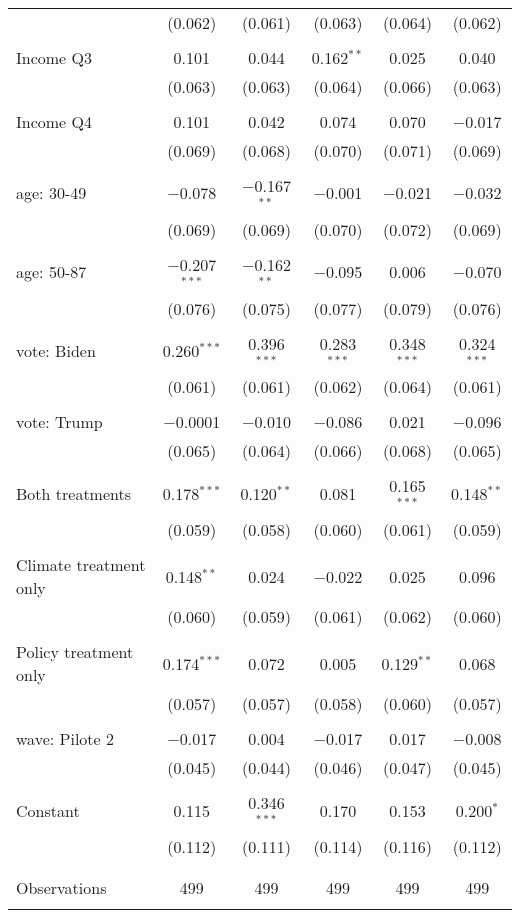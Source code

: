 \begin{tabular}{@{\extracolsep{5pt}}lccccc}
  & (0.062) & (0.061) & (0.063) & (0.064) & (0.062) \\ 
  & & & & & \\ 
 Income Q3 & 0.101 & 0.044 & 0.162$^{**}$ & 0.025 & 0.040 \\ 
  & (0.063) & (0.063) & (0.064) & (0.066) & (0.063) \\ 
  & & & & & \\ 
 Income Q4 & 0.101 & 0.042 & 0.074 & 0.070 & $-$0.017 \\ 
  & (0.069) & (0.068) & (0.070) & (0.071) & (0.069) \\ 
  & & & & & \\ 
 age: 30-49 & $-$0.078 & $-$0.167$^{**}$ & $-$0.001 & $-$0.021 & $-$0.032 \\ 
  & (0.069) & (0.069) & (0.070) & (0.072) & (0.069) \\ 
  & & & & & \\ 
 age: 50-87 & $-$0.207$^{***}$ & $-$0.162$^{**}$ & $-$0.095 & 0.006 & $-$0.070 \\ 
  & (0.076) & (0.075) & (0.077) & (0.079) & (0.076) \\ 
  & & & & & \\ 
 vote: Biden & 0.260$^{***}$ & 0.396$^{***}$ & 0.283$^{***}$ & 0.348$^{***}$ & 0.324$^{***}$ \\ 
  & (0.061) & (0.061) & (0.062) & (0.064) & (0.061) \\ 
  & & & & & \\ 
 vote: Trump & $-$0.0001 & $-$0.010 & $-$0.086 & 0.021 & $-$0.096 \\ 
  & (0.065) & (0.064) & (0.066) & (0.068) & (0.065) \\ 
  & & & & & \\ 
 Both treatments & 0.178$^{***}$ & 0.120$^{**}$ & 0.081 & 0.165$^{***}$ & 0.148$^{**}$ \\ 
  & (0.059) & (0.058) & (0.060) & (0.061) & (0.059) \\ 
  & & & & & \\ 
 Climate treatment only & 0.148$^{**}$ & 0.024 & $-$0.022 & 0.025 & 0.096 \\ 
  & (0.060) & (0.059) & (0.061) & (0.062) & (0.060) \\ 
  & & & & & \\ 
 Policy treatment only & 0.174$^{***}$ & 0.072 & 0.005 & 0.129$^{**}$ & 0.068 \\ 
  & (0.057) & (0.057) & (0.058) & (0.060) & (0.057) \\ 
  & & & & & \\ 
 wave: Pilote 2 & $-$0.017 & 0.004 & $-$0.017 & 0.017 & $-$0.008 \\ 
  & (0.045) & (0.044) & (0.046) & (0.047) & (0.045) \\ 
  & & & & & \\ 
 Constant & 0.115 & 0.346$^{***}$ & 0.170 & 0.153 & 0.200$^{*}$ \\ 
  & (0.112) & (0.111) & (0.114) & (0.116) & (0.112) \\ 
  & & & & & \\ 
\hline \\[-1.8ex] 

Observations & 499 & 499 & 499 & 499 & 499 \\ 
\hline 
\hline \\[-1.8ex] 
\end{tabular} 